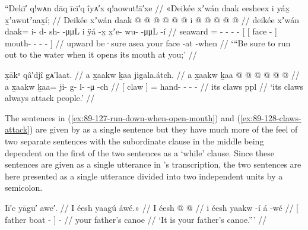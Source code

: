 \ex\label{ex:89-127-run-down-when-open-mouth}%
%
\begingl
	\glpreamble	“Dekī′ q!wᴀn dāq īcī′q îyᴀ′x q!aowut!ā′xe //
	\glpreamble	«\!Deikée xʼwán daak eesheex i yáx̱ x̱ʼawutʼaax̱í; //
	\gla	{}Deikée xʼwán 
		daak @  @ {} @ {} @ {} @ {} @ {}
		{} {} i  @ {} {}
			 @ {} @ {} @ {} @ {} {}  //
	\glb	\pqp{}deikée xʼwán
		daak= {} i- d- sh-  -μμL
		{} {} i ÿá -x̱ {}
			x̱ʼe- wu-  -μμL -í {} //
	\glc	\pqp{}seaward 
		= \· - - -  -
		{}[ {}[  face - {}]
			mouth- -  - - {}] //
	\gld	\pqp{}upward be·sure
		asea\•  {} {} {} {} {}
		{} {} your face -at {}
			 {} {} {} -when {} //
	\glft	‘“Be sure to run out to the water when it opens its mouth at you;’
		//
\endgl
\xe

\clearpage
\ex\label{ex:89-128-claws-attack}%
%
\begingl
	\glpreamble	x̣ākᵘ qâ′djî gᴀ′laat. //
	\glpreamble	a x̱aakw ḵaa jigala.átch. //
	\gla	{} a x̱aakw {}
		ḵaa @  @ {} @ {} @ {} @ {} @ {} //
	\glb	{} a x̱aakw {}
		ḵaa= ji- g- l-  -μ -ch //
	\glc	{}[  claw {}]
		= hand- - -  - //
	\gld	{} its claws {}
		ppl\•  {} {} {} {} {} //
	\glft	‘its claws always attack people.’
		//
\endgl
\xe

The sentences in (\ref{ex:89-127-run-down-when-open-mouth}) and (\ref{ex:89-128-claws-attack}) are given by \citeauthor{swanton:1909} as a single sentence but they have much more of the feel of two separate sentences with the subordinate clause in the middle being dependent on the first of the two sentences as a ‘while’ clause.
Since these sentences are given as a single utterance in \citeauthor{swanton:1909}’s transcription, the two sentences are here presented as a single utterance divided into two independent units by a semicolon.

\ex\label{ex:89-129-fathers-canoe}%
%
\begingl
	\glpreamble	Iī′c yāgu′ awe′. //
	\glpreamble	I éesh yaagú áwé.\!» //
	\gla	{} I éesh  @ {} {}  @ {} //
	\glb	{} i éesh yaakw -í {} á -wé //
	\glc	{}[  father boat - {}]  - //
	\gld	{} your father’s canoe {} {}  {} //
	\glft	‘It is your father’s canoe.”’
		//
\endgl
\xe

